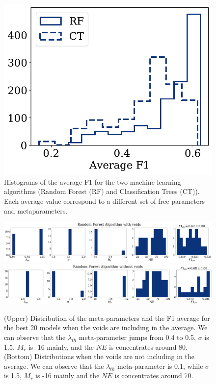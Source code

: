 \documentclass[usenatbib]{mnras}
\begin{document}
\begin{figure}
    \includegraphics[scale=0.55]{Figs/p_hist_f1.pdf}
    \caption{Histograms of the average F1 for the two machine
      learning algorithms (Random Forest (RF) and Classification Trees (CT)). 
      Each average value correspond to a different set of free parameters and metaparameters.}
    \label{fig:methods}
\end{figure}


\begin{figure}
\centering
    \includegraphics[scale=0.23]{Figs/p_features_Forest_F1_av.pdf}
    \includegraphics[scale=0.23]{Figs/p_features_Forest_F1_av_no_voids.pdf}
    \caption{(Upper) Distribution of the meta-parameters and the F1 average for the best 20 models when the voids are including in the average. We can observe that  the $\lambda_{th}$ meta-parameter jumps from 0.4 to 0.5, $\sigma$ is 1.5, $M_r$ is -16 mainly, and the $NE$ is concentrates around 80.
    (Bottom) Distributions when the voids are not including in the average. We can observe that the $\lambda_{th}$ meta-parameter is 0.1, while $\sigma$ is 1.5, $M_r$ is -16 mainly and the $NE$ is concentrates around 70.
      } 
    \label{fig:features_score}    
\end{figure}
\end{document}
